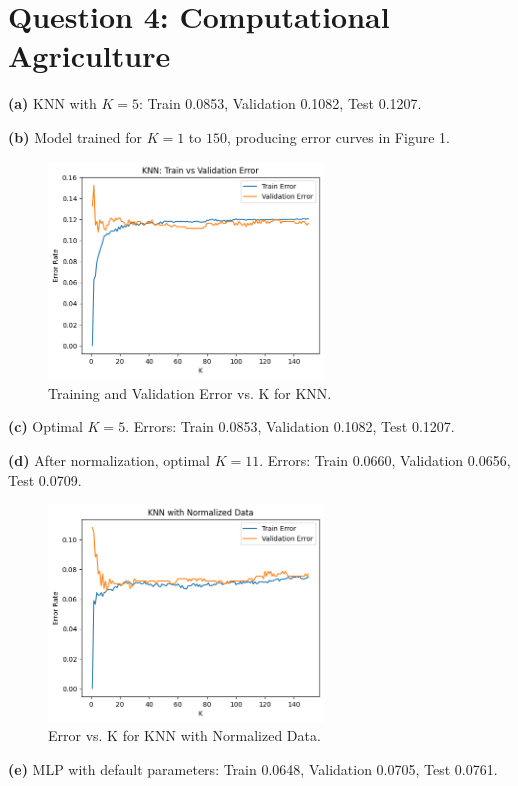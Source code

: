 \documentclass[11pt]{article}
\begin{document}
\section*{Question 4: Computational Agriculture}
\noindent\textbf{(a)} KNN with $K=5$: Train 0.0853, Validation 0.1082, Test 0.1207.  

\noindent\textbf{(b)} Model trained for $K=1$ to $150$, producing error curves in Figure 1.
\begin{figure}[H]
\centering
\includegraphics[width=0.65\textwidth]{knn_train_v_validation.png}
\caption{Training and Validation Error vs. K for KNN.}
\end{figure}

\noindent\textbf{(c)} Optimal $K=5$. Errors: Train 0.0853, Validation 0.1082, Test 0.1207.  

\noindent\textbf{(d)} After normalization, optimal $K=11$. Errors: Train 0.0660, Validation 0.0656, Test 0.0709.
\begin{figure}[H]
\centering
\includegraphics[width=0.65\textwidth]{knn_normalized.png}
\caption{Error vs. K for KNN with Normalized Data.}
\end{figure}

\noindent\textbf{(e)} MLP with default parameters: Train 0.0648, Validation 0.0705, Test 0.0761.  
\end{document}
